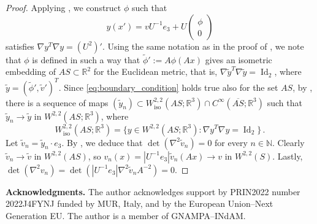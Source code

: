 \documentclass{article}
\theoremstyle{plain}
\theoremstyle{plain}
\theoremstyle{plain}
\theoremstyle{plain}
\theoremstyle{plain}
\theoremstyle{definition}
\theoremstyle{definition}
\renewcommand{\r}{\mathbb{R}}
\newcommand{\n}{\mathbb{N}}
\DeclareMathOperator{\Id}{Id}
\begin{document}
\begin{proof}
    Applying , we construct $\phi$ such that
    \[
        y(x') = vU^{-1}e_3 + U\begin{pmatrix}
            \phi\\
            0
        \end{pmatrix}
    \]
    satisfies $\nabla y^T \nabla y = (U^2)'$. Using the same notation as in the proof of , we note that $\phi$ is defined in such a way that $\tilde \phi' := A\phi(Ax)$ gives an isometric embedding of $AS \subset \r^2$ for the Euclidean metric, that is, $\nabla \tilde y^T \nabla \tilde y = \Id_2$, where $\tilde y = (\tilde \phi', \tilde v')^T$. Since \eqref{eq:boundary_condition} holds true also for the set $AS$, by \cite[Theorem 1]{HORNUNG2011}, there is a sequence of maps $(\tilde y_n) \subset W^{2,2}_{\text{iso}}(AS; \r^3) \cap C^\infty(\overline{AS}; \r^3)$ such that $\tilde y_n \to \tilde y$ in $W^{2,2}(AS; \r^3)$, where
    \[
    	W^{2, 2}_{\text{iso}}(AS; \r^3) = \{y \in W^{2,2}(AS; \r^3) \colon \nabla y^T \nabla y = \Id_2\} \,.
    \]
    Let $\tilde v_n = \tilde y_n \cdot e_3$. By \cite[Theorem 7]{FRIESECKE2006}, we deduce that $\det(\nabla^2 \tilde v_n) = 0$ for every $n \in \n$. Clearly $\tilde v_n \to \tilde v$ in $W^{2, 2}(AS)$, so $v_n(x) = |U^{-1}e_3| \tilde v_n(Ax) \to v$ in $W^{2,2}(S)$. Lastly, $\det(\nabla^2 v_n) = \det(|U^{-1}e_3|\nabla^2 \tilde v_n A^{-2}) = 0$. 
\end{proof}


\noindent \textbf{Acknowledgments.} The author acknowledges support by PRIN2022 number 2022J4FYNJ funded by MUR, Italy, and by the European Union--Next Generation EU. The author is a member of GNAMPA--INdAM.


\printbibliography
\end{document}
